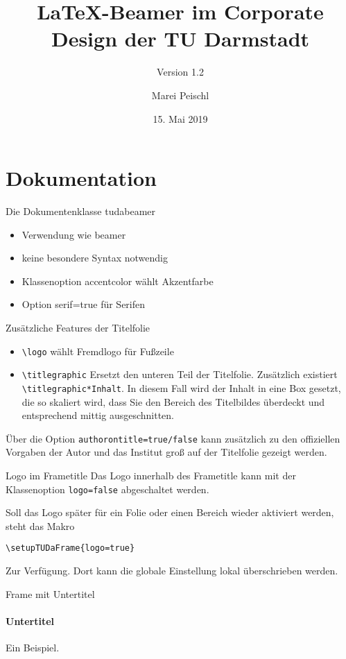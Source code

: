 \documentclass[
	ngerman,%
	aspectratio=169,%
	accentcolor=2d,%
	logo=false,%
	colorframetitle=true,%
	]{tudabeamer}
\title{LaTeX-Beamer im Corporate Design der TU Darmstadt}
\subtitle{Version 1.2}
\author[M. Peischl]{Marei Peischl}
\institute{pei\TeX}
\date{15. Mai 2019}
\let\code\texttt
\begin{document}
\maketitle

\section{Dokumentation}
\begin{frame}{Die Dokumentenklasse tudabeamer}
\begin{itemize}
	\item Verwendung wie beamer
	\item keine besondere Syntax notwendig
	\item Klassenoption accentcolor wählt Akzentfarbe
	\item Option serif=true für Serifen	
\end{itemize}
\end{frame}

\begin{frame}{Zusätzliche Features der Titelfolie}
\begin{itemize}
	\item \code{\textbackslash{}logo} wählt Fremdlogo für Fußzeile
	\item \code{\textbackslash{}titlegraphic} Ersetzt den unteren Teil der Titelfolie. Zusätzlich existiert \code{\textbackslash{}titlegraphic*{Inhalt}}.
	In diesem Fall wird der Inhalt in eine Box gesetzt, die so skaliert wird, dass Sie den Bereich des Titelbildes überdeckt und entsprechend mittig ausgeschnitten.
\end{itemize}
	Über die Option \code{authorontitle=true/false} kann zusätzlich zu den offiziellen Vorgaben der Autor und das Institut groß auf der Titelfolie gezeigt werden.
\end{frame}

\begin{frame}[fragile]{Logo im Frametitle}
Das Logo innerhalb des Frametitle kann mit der Klassenoption \code{logo=false} abgeschaltet werden.

Soll das Logo später für ein Folie oder einen Bereich wieder aktiviert werden, steht das Makro
\begin{verbatim}
\setupTUDaFrame{logo=true}
\end{verbatim}
Zur Verfügung. Dort kann die globale Einstellung lokal überschrieben werden.
\end{frame}

\begin{frame}{Frame mit Untertitel}
\framesubtitle{Untertitel}
Ein Beispiel.
\end{frame}
\end{document}
